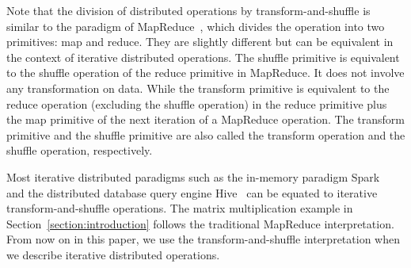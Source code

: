 \documentclass[10pt,journal,compsoc]{IEEEtran}
\begin{document}
Note that the division of distributed operations by transform-and-shuffle is similar to the paradigm of 
MapReduce~\cite{dean2008mapreduce}, which divides the operation into two primitives: map and reduce.
They are slightly different but can be equivalent in the context of iterative distributed operations.  
The shuffle primitive is equivalent to the shuffle operation of the reduce primitive in MapReduce. 
It does not involve any transformation on data.
While the transform primitive is equivalent to the reduce operation
(excluding the shuffle operation) in the reduce primitive plus the map primitive of the next iteration of a MapReduce operation. 
The transform primitive and the shuffle primitive are also called the transform operation and the shuffle operation, respectively.




Most iterative distributed paradigms such as the in-memory paradigm
Spark~\cite{zaharia2012resilient} and the distributed database query
engine Hive~\cite{thusoo2009hive} can be equated to iterative transform-and-shuffle operations.
The matrix multiplication example in Section~\ref{section:introduction}
follows the traditional MapReduce interpretation. 
From now on in this paper, we use the transform-and-shuffle interpretation when we describe iterative distributed operations.

\end{document}
